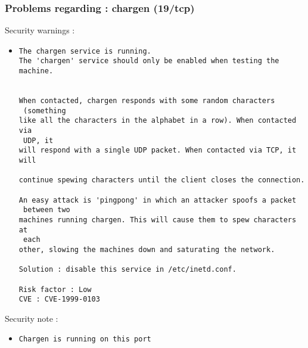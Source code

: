 \documentclass{article}
\begin{document}
\subsubsection{Problems regarding : chargen (19/tcp)}
Security warnings :\\
\begin{itemize}
\item \begin{verbatim}
The chargen service is running.
The 'chargen' service should only be enabled when testing the machine.
 

When contacted, chargen responds with some random characters
 (something
like all the characters in the alphabet in a row). When contacted via
 UDP, it 
will respond with a single UDP packet. When contacted via TCP, it will
 
continue spewing characters until the client closes the connection. 

An easy attack is 'pingpong' in which an attacker spoofs a packet
 between two
machines running chargen. This will cause them to spew characters at
 each 
other, slowing the machines down and saturating the network.
      
Solution : disable this service in /etc/inetd.conf.

Risk factor : Low
CVE : CVE-1999-0103
\end{verbatim}\end{itemize}
Security note :\\
\begin{itemize}
\item \begin{verbatim}
Chargen is running on this port
\end{verbatim}\end{itemize}
\end{document}
